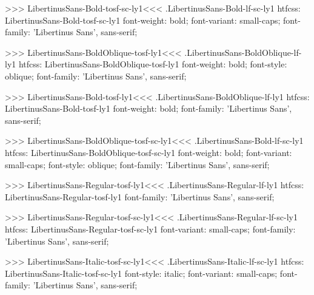 >>>
\<LibertinusSans-Bold-tosf-sc-ly1\><<<
.LibertinusSans-Bold-lf-sc-ly1
htfcss:  LibertinusSans-Bold-tosf-sc-ly1  font-weight: bold; font-variant: small-caps; font-family: 'Libertinus Sans', sans-serif;

>>>
\<LibertinusSans-BoldOblique-tosf-ly1\><<<
.LibertinusSans-BoldOblique-lf-ly1
htfcss:  LibertinusSans-BoldOblique-tosf-ly1  font-weight: bold; font-style: oblique; font-family: 'Libertinus Sans', sans-serif;

>>>
\<LibertinusSans-Bold-tosf-ly1\><<<
.LibertinusSans-BoldOblique-lf-ly1
htfcss:  LibertinusSans-Bold-tosf-ly1  font-weight: bold; font-family: 'Libertinus Sans', sans-serif;

>>>
\<LibertinusSans-BoldOblique-tosf-sc-ly1\><<<
.LibertinusSans-Bold-lf-sc-ly1
htfcss:  LibertinusSans-BoldOblique-tosf-sc-ly1  font-weight: bold; font-variant: small-caps; font-style: oblique; font-family: 'Libertinus Sans', sans-serif;

>>>
\<LibertinusSans-Regular-tosf-ly1\><<<
.LibertinusSans-Regular-lf-ly1
htfcss:  LibertinusSans-Regular-tosf-ly1  font-family: 'Libertinus Sans', sans-serif;

>>>
\<LibertinusSans-Regular-tosf-sc-ly1\><<<
.LibertinusSans-Regular-lf-sc-ly1
htfcss:  LibertinusSans-Regular-tosf-sc-ly1  font-variant: small-caps; font-family: 'Libertinus Sans', sans-serif;

>>>
\<LibertinusSans-Italic-tosf-sc-ly1\><<<
.LibertinusSans-Italic-lf-sc-ly1
htfcss:  LibertinusSans-Italic-tosf-sc-ly1  font-style: italic; font-variant: small-caps; font-family: 'Libertinus Sans', sans-serif;

